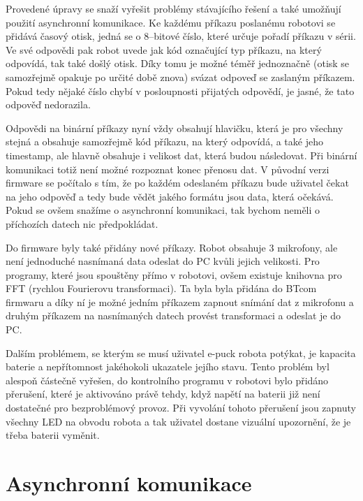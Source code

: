 \documentclass[12pt,notitlepage]{report}
\begin{document}
    Provedené úpravy se snaží vyřešit problémy stávajícího řešení a také
    umožňují použití asynchronní komunikace. Ke každému příkazu poslanému
    robotovi se přidává časový otisk, jedná se o 8--bitové číslo, které určuje
    pořadí příkazu v sérii. Ve své odpovědi pak robot uvede jak kód označující
    typ příkazu, na který odpovídá, tak také došlý otisk. Díky tomu je možné
    téměř jednoznačně (otisk se samozřejmě opakuje po určité době znova) svázat
    odpoveď se zaslaným příkazem. Pokud tedy nějaké číslo chybí v posloupnosti
    přijatých odpovědí, je jasné, že tato odpověď nedorazila.

    Odpovědi na binární příkazy nyní vždy obsahují hlavičku, která je pro
    všechny stejná a obsahuje samozřejmě kód příkazu, na který odpovídá, a také
    jeho timestamp, ale hlavně obsahuje i velikost dat, která budou následovat.
    Při binární komunikaci totiž není možné rozpoznat konec přenosu dat. V
    původní verzi firmware se počítalo s tím, že po každém odeslaném příkazu
    bude uživatel čekat na jeho odpověď a tedy bude vědět jakého formátu jsou
    data, která očekává. Pokud se ovšem snažíme o asynchronní komunikaci, tak
    bychom neměli o příchozích datech nic předpokládat.

    Do firmware byly také přidány nové příkazy. Robot obsahuje 3 mikrofony, ale
    není jednoduché nasnímaná data odeslat do PC kvůli jejich velikosti. Pro
    programy, které jsou spouštěny přímo v robotovi, ovšem existuje knihovna
    pro FFT (rychlou Fourierovu transformaci). Ta byla byla přidána do BTcom
    firmwaru a díky ní je možné jedním příkazem zapnout snímání dat z mikrofonu
    a druhým příkazem na nasnímaných datech provést transformaci a odeslat je
    do PC.

    Dalším problémem, se kterým se musí uživatel e-puck robota potýkat, je
    kapacita baterie a nepřítomnost jakéhokoli ukazatele jejího stavu. Tento
    problém byl alespoň částečně vyřešen, do kontrolního programu v robotovi
    bylo přidáno přerušení, které je aktivováno právě tehdy, když napětí na
    baterii již není dostatečné pro bezproblémový provoz. Při vyvolání tohoto
    přerušení jsou zapnuty všechny LED na obvodu robota a tak uživatel dostane
    vizuální upozornění, že je třeba baterii vyměnit.

    \section{Asynchronní komunikace}
    \label{async-impl}
\end{document}
